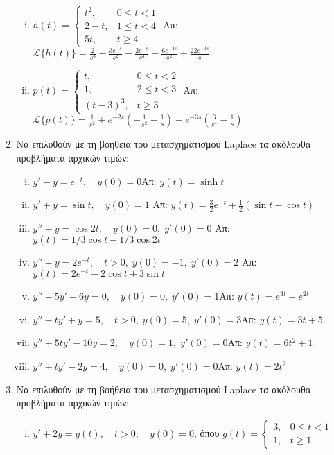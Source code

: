 \begin{enumerate}
\begin{enumerate}[i)]
      \item $h(t)=
        \begin{cases} 
          t^{2}, & 0\leq t<1 \\ 2-t, & 1\leq t < 4 \\ 5t, & t\geq 4
        \end{cases}$ 
        \hfill Απ: $\mathcal{L}\{h(t)\}=\frac{2}{s^{3}}-\frac{3e^{-s}}{s^{2}}-
        \frac{2e^{-s}}{s^{3}}+\frac{6e^{-4s}}{s^{2}}+\frac{22e^{-4s}}{s}$

      \item $p(t)=
        \begin{cases} 
          t, & 0\leq t< 2 \\ 1, & 2\leq t < 3 \\ (t-3)^{3}, & t\geq 3
        \end{cases}$ 
        \hfill Απ: $\mathcal{L}\{p(t)\}=\frac{1}{s^{2}}+e^{-2s}
        \left(-\frac{1}{s^{2}}-\frac{1}{s}\right)+e^{-3s}
        \left(\frac{6}{s^{4}}-\frac{1}{s}\right)$
    \end{enumerate}

  \item Να επιλυθούν με τη βοήθεια του μετασχηματισμού Laplace τα ακόλουθα 
    προβλήματα αρχικών τιμών:
    \begin{enumerate}[i)]
      \item $y'-y=e^{-t},\quad y(0)=0$\hfill Απ: $y(t)=\sinh t$
      \item $y'+y=\sin t,\quad y(0)=1$
        \hfill Απ: $y(t)=\frac{3}{2}e^{-t}+\frac{1}{2}(\sin t-\cos t)$
      \item $y''+y =\cos 2t, \quad y(0)=0, \; y'(0)=0$ 
        \hfill Απ: $y(t)={1}/{3}\cos t-{1}/{3}\cos 2t$
      \item $y''+y=2e^{-t},\quad t>0, \; y(0)=-1, \; y'(0)=2$
        \hfill Απ: $y(t)=2e^{-t}-2\cos t+3\sin t$
      \item $y''-5y'+6y=0,\quad y(0)=0, \; y'(0)=1$\hfill Απ: $y(t)=e^{3t}-e^{2t}$
      \item $y''-ty'+y=5, \quad t>0, \; y(0)=5, \; y'(0)=3$\hfill Απ: $y(t)=3t+5$
      \item $y'' +5ty'-10y=2, \quad y(0)=1, \; y'(0)=0$\hfill Απ: $y(t)=6t^2+1$
      \item $y'' +ty'-2y=4, \quad y(0)=0, \; y'(0)=0$\hfill Απ: $y(t)=2t^2$
    \end{enumerate}

  \item Να επιλυθούν με τη βοήθεια του μετασχηματισμού Laplace τα ακόλουθα 
    προβλήματα αρχικών τιμών:
    \begin{enumerate}[i)]
      \item $y'+2y=g(t),\quad t>0,\quad y(0)=0$, 
        όπου $g(t)=
        \begin{cases}
          3, & 0\leq t<1 \\ 1, & t\geq 1
        \end{cases}$


\end{enumerate}
\end{enumerate}
